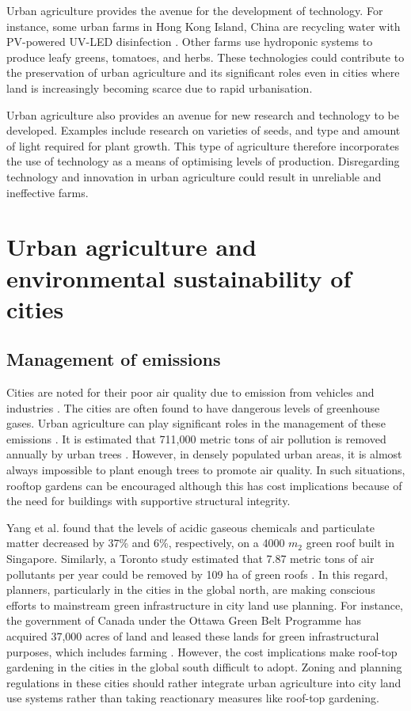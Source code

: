 Urban agriculture provides the avenue for the development of technology. For instance, some urban farms in Hong Kong Island, China are recycling water with PV-powered UV-LED disinfection \cite{Close2006}. Other farms use hydroponic \cite{Buehler2016} systems to produce leafy greens, tomatoes, and herbs. These technologies could contribute to the preservation of urban agriculture and its significant roles even in cities where land is increasingly becoming scarce due to rapid urbanisation.

Urban agriculture also provides an avenue for new research and technology to be developed. Examples include research on varieties of seeds, and type and amount of light required for plant growth. This type of agriculture therefore incorporates the use of technology as a means of optimising levels of production. Disregarding technology and innovation in urban agriculture could result in unreliable and ineffective farms.

\section{Urban agriculture and environmental sustainability of cities}

\subsection{Management of emissions}

Cities are noted for their poor air quality due to emission from vehicles and industries \cite{Heather2012}. The cities are often found to have dangerous levels of greenhouse gases. Urban agriculture can play significant roles in the management of these emissions \cite{Padgham2015}. It is estimated that 711,000 metric tons of air pollution is removed annually by urban trees \cite{Yang2008}. However, in densely populated urban areas, it is almost always impossible to plant enough trees to promote air quality. In such situations, rooftop gardens can be encouraged although this has cost implications because of the need for buildings with supportive structural integrity.

Yang et al. \cite{Yang2008} found that the levels of acidic gaseous chemicals and particulate matter decreased by 37\% and 6\%, respectively, on a 4000 $m_{2}$ green roof built in Singapore. Similarly, a Toronto study estimated that 7.87 metric tons of air pollutants per year could be removed by 109 ha of green roofs \cite{Yang2008}. In this regard, planners, particularly in the cities in the global north, are making conscious efforts to mainstream green infrastructure in city land use planning. For instance, the government of Canada under the Ottawa Green Belt Programme has acquired 37,000 acres of land and leased these lands for green infrastructural purposes, which includes farming \cite{Pearson2010}. However, the cost implications make roof-top gardening in the cities in the global south difficult to adopt. Zoning and planning regulations in these cities should rather integrate urban agriculture into city land use systems rather than taking reactionary measures like roof-top gardening.

